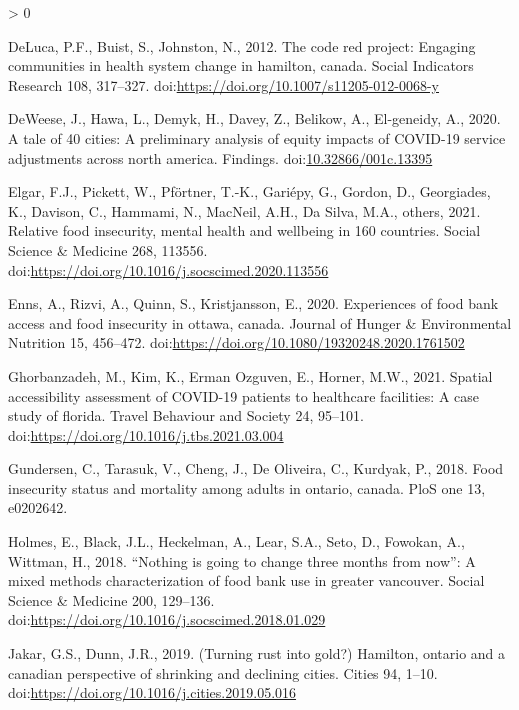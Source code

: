 \documentclass[]{elsarticle} %
\newlength{\cslhangindent}
\newenvironment{CSLReferences}[2] %
 {%
  \setlength{\parindent}{0pt}
  \ifodd #1 \everypar{\setlength{\hangindent}{\cslhangindent}}\ignorespaces\fi
  \ifnum #2 > 0
  \setlength{\parskip}{#2\baselineskip}
  \fi
 }%
 {}
\begin{document}
\begin{CSLReferences}{1}{0}
\leavevmode\hypertarget{ref-deluca2012code}{}%
DeLuca, P.F., Buist, S., Johnston, N., 2012. The code red project:
Engaging communities in health system change in hamilton, canada. Social
Indicators Research 108, 317--327.
doi:\url{https://doi.org/10.1007/s11205-012-0068-y}

\leavevmode\hypertarget{ref-deweese2020tale}{}%
DeWeese, J., Hawa, L., Demyk, H., Davey, Z., Belikow, A., El-geneidy,
A., 2020. A tale of 40 cities: A preliminary analysis of equity impacts
of COVID-19 service adjustments across north america. Findings.
doi:\href{https://doi.org/10.32866/001c.13395}{10.32866/001c.13395}

\leavevmode\hypertarget{ref-elgar2021relative}{}%
Elgar, F.J., Pickett, W., Pförtner, T.-K., Gariépy, G., Gordon, D.,
Georgiades, K., Davison, C., Hammami, N., MacNeil, A.H., Da Silva, M.A.,
others, 2021. Relative food insecurity, mental health and wellbeing in
160 countries. Social Science \& Medicine 268, 113556.
doi:\url{https://doi.org/10.1016/j.socscimed.2020.113556}

\leavevmode\hypertarget{ref-enns2020experiences}{}%
Enns, A., Rizvi, A., Quinn, S., Kristjansson, E., 2020. Experiences of
food bank access and food insecurity in ottawa, canada. Journal of
Hunger \& Environmental Nutrition 15, 456--472.
doi:\url{https://doi.org/10.1080/19320248.2020.1761502}

\leavevmode\hypertarget{ref-ghorbanzadeh2021spatial}{}%
Ghorbanzadeh, M., Kim, K., Erman Ozguven, E., Horner, M.W., 2021.
Spatial accessibility assessment of COVID-19 patients to healthcare
facilities: A case study of florida. Travel Behaviour and Society 24,
95--101. doi:\url{https://doi.org/10.1016/j.tbs.2021.03.004}

\leavevmode\hypertarget{ref-gundersen2018food}{}%
Gundersen, C., Tarasuk, V., Cheng, J., De Oliveira, C., Kurdyak, P.,
2018. Food insecurity status and mortality among adults in ontario,
canada. PloS one 13, e0202642.

\leavevmode\hypertarget{ref-holmes2018nothing}{}%
Holmes, E., Black, J.L., Heckelman, A., Lear, S.A., Seto, D., Fowokan,
A., Wittman, H., 2018. {``Nothing is going to change three months from
now''}: A mixed methods characterization of food bank use in greater
vancouver. Social Science \& Medicine 200, 129--136.
doi:\url{https://doi.org/10.1016/j.socscimed.2018.01.029}

\leavevmode\hypertarget{ref-jakar2019turning}{}%
Jakar, G.S., Dunn, J.R., 2019. (Turning rust into gold?) Hamilton,
ontario and a canadian perspective of shrinking and declining cities.
Cities 94, 1--10. doi:\url{https://doi.org/10.1016/j.cities.2019.05.016}


\end{CSLReferences}
\end{document}

